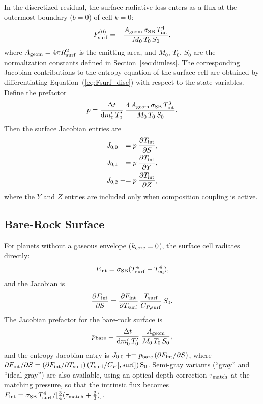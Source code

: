 \documentclass{aastex631}
\newcommand{\dd}{\mathrm{d}}
\newcommand{\pp}{\partial}
\newcommand{\Cp}{C_P}
\newcommand{\Tint}{T_{\rm int}}
\newcommand{\Tsurf}{T_{\rm surf}}
\begin{document}
In the discretized residual, the surface radiative loss enters as a
flux at the outermost boundary ($b=0$) of cell $k=0$:
\begin{equation}\label{eq:Fsurf_disc}
  F^{(0)}_{\rm surf}
  = -\frac{A_{\rm geom}\,\sigma_{\rm SB}\,\Tint^4}{M_0\,T_0\,S_0},
\end{equation}
where $A_{\rm geom} = 4\pi R_{\rm surf}^2$ is the emitting area,
and $M_0$, $T_0$, $S_0$ are the normalization constants defined in
Section~\ref{sec:dimless}.  The corresponding Jacobian contributions
to the entropy equation of the surface cell are obtained by
differentiating Equation~(\ref{eq:Fsurf_disc}) with respect to the
state variables.  Define the prefactor
\begin{equation}\label{eq:surf_pref}
  p = \frac{\Delta t}{\dd m'_0\,T'_0}
      \;\frac{4\,A_{\rm geom}\,\sigma_{\rm SB}\,\Tint^3}
             {M_0\,T_0\,S_0}.
\end{equation}
Then the surface Jacobian entries are
\begin{align}
  J_{0,0}   &\mathrel{+}= p\;\frac{\pp\Tint}{\pp S},
  \label{eq:Jsurf_S}\\
  J_{0,1}   &\mathrel{+}= p\;\frac{\pp\Tint}{\pp Y},
  \label{eq:Jsurf_Y}\\
  J_{0,2}   &\mathrel{+}= p\;\frac{\pp\Tint}{\pp Z},
  \label{eq:Jsurf_Z}
\end{align}
where the $Y$ and $Z$ entries are included only when composition
coupling is active.

\subsection{Bare-Rock Surface}

For planets without a gaseous envelope ($k_{\rm core}=0$), the surface
cell radiates directly:
\begin{equation}
  F_{\rm int} = \sigma_{\rm SB}(\Tsurf^4 - T_{\rm eq}^4),
\end{equation}
and the Jacobian is
\begin{equation}
  \frac{\pp F_{\rm int}}{\pp S}
  = \frac{\pp F_{\rm int}}{\pp\Tsurf}
    \,\frac{T_{\rm surf}}{C_{P,{\rm surf}}}
    \,S_0.
\end{equation}
The Jacobian prefactor for the bare-rock surface is
\begin{equation}\label{eq:pref_bare}
  p_{\rm bare}
  = \frac{\Delta t}{\dd m'_0\,T'_0}
    \;\frac{A_{\rm geom}}{M_0\,T_0\,S_0},
\end{equation}
and the entropy Jacobian entry is
$J_{0,0} \mathrel{+}= p_{\rm bare}\,(\pp F_{\rm int}/\pp S)$,
where
$\pp F_{\rm int}/\pp S
 = (\pp F_{\rm int}/\pp\Tsurf)\,(T_{\rm surf}/\Cp[,\rm surf])\,S_0$.
Semi-gray variants (``gray'' and ``ideal gray'') are also available,
using an optical-depth correction $\tau_{\rm match}$ at the matching
pressure, so that the intrinsic flux becomes
$F_{\rm int} = \sigma_{\rm SB}\,\Tsurf^4/[\tfrac{3}{4}(\tau_{\rm match}+\tfrac{2}{3})]$.
\end{document}
